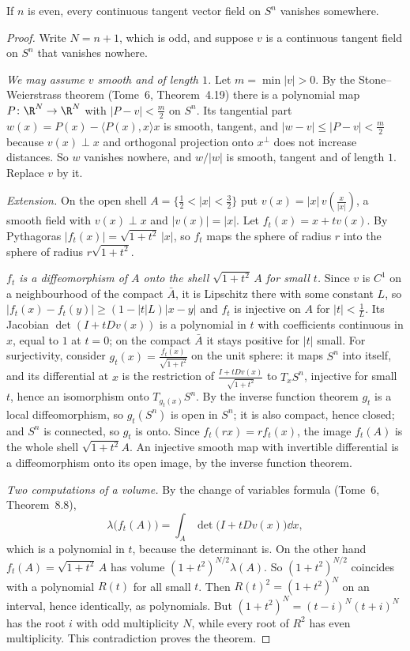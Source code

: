 \begin{theorem}\label{thm:hairyball}
If $n$ is even, every continuous tangent vector field on $S^n$ vanishes somewhere.
\end{theorem}
\begin{proof}
Write $N=n+1$, which is odd, and suppose $v$ is a continuous tangent field on $S^n$ that vanishes nowhere.

\emph{We may assume $v$ smooth and of length $1$.} Let $m=\min|v|>0$. By the Stone--Weierstrass theorem (Tome~6, Theorem~4.19) there is a polynomial map
$P\colon\R^N\to\R^N$ with $|P-v|<\frac m2$ on $S^n$. Its tangential part $w(x)=P(x)-\langle P(x),x\rangle x$ is smooth, tangent, and $|w-v|\le|P-v|<\frac m2$
because $v(x)\perp x$ and orthogonal projection onto $x^\perp$ does not increase distances. So $w$ vanishes nowhere, and $w/|w|$ is smooth, tangent and of
length $1$. Replace $v$ by it.

\emph{Extension.} On the open shell $A=\{\frac12<|x|<\frac32\}$ put $v(x)=|x|\,v(\frac x{|x|})$, a smooth field with $v(x)\perp x$ and $|v(x)|=|x|$. Let
$f_t(x)=x+tv(x)$. By Pythagoras $|f_t(x)|=\sqrt{1+t^2}\,|x|$, so $f_t$ maps the sphere of radius $r$ into the sphere of radius $r\sqrt{1+t^2}$.

\emph{$f_t$ is a diffeomorphism of $A$ onto the shell $\sqrt{1+t^2}\,A$ for small $t$.} Since $v$ is $C^1$ on a neighbourhood of the compact $\bar A$, it is
Lipschitz there with some constant $L$, so $|f_t(x)-f_t(y)|\ge(1-|t|L)|x-y|$ and $f_t$ is injective on $A$ for $|t|<\frac1L$. Its Jacobian $\det(I+tDv(x))$ is a
polynomial in $t$ with coefficients continuous in $x$, equal to $1$ at $t=0$; on the compact $\bar A$ it stays positive for $|t|$ small. For surjectivity,
consider $g_t(x)=\frac{f_t(x)}{\sqrt{1+t^2}}$ on the unit sphere: it maps $S^n$ into itself, and its differential at $x$ is the restriction of
$\frac{I+tDv(x)}{\sqrt{1+t^2}}$ to $T_xS^n$, injective for small $t$, hence an isomorphism onto $T_{g_t(x)}S^n$. By the inverse function theorem $g_t$ is a
local diffeomorphism, so $g_t(S^n)$ is open in $S^n$; it is also compact, hence closed; and $S^n$ is connected, so $g_t$ is onto. Since $f_t(rx)=rf_t(x)$, the
image $f_t(A)$ is the whole shell $\sqrt{1+t^2}A$. An injective smooth map with invertible differential is a diffeomorphism onto its open image, by the
inverse function theorem.

\emph{Two computations of a volume.} By the change of variables formula (Tome~6, Theorem~8.8),
\[
\lambda\bigl(f_t(A)\bigr)=\int_A\det\bigl(I+tDv(x)\bigr)\dd x,
\]
which is a polynomial in $t$, because the determinant is. On the other hand $f_t(A)=\sqrt{1+t^2}\,A$ has volume $(1+t^2)^{N/2}\lambda(A)$. So
$(1+t^2)^{N/2}$ coincides with a polynomial $R(t)$ for all small $t$. Then $R(t)^2=(1+t^2)^N$ on an interval, hence identically, as polynomials. But
$(1+t^2)^N=(t-i)^N(t+i)^N$ has the root $i$ with odd multiplicity $N$, while every root of $R^2$ has even multiplicity. This contradiction proves the theorem.
\end{proof}

